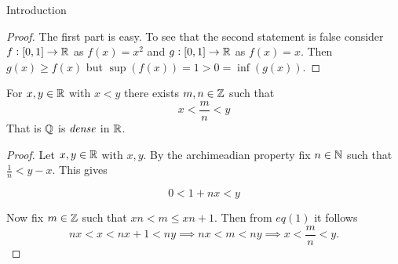 \begin{chapter}{Introduction}
    
    \begin{proof}
        The first part is easy. To see that the second statement is false consider $f:[0,1] \to \mathbb{R}$ as $f(x) = x^2$ and 
        $g: [0, 1] \to \mathbb{R}$ as $f(x) = x$. Then $g(x) \geq f(x)$ but $\sup(f(x)) = 1 > 0 = \inf(g(x))$. 
    \end{proof}


    
    \begin{thm}
        For $x, y \in \mathbb{R}$ with $x < y$ there exists $m, n \in \mathbb{Z}$ such that 
        \[x < \frac{m}{n} < y\]
        That is $\mathbb{Q}$ is $\emph{dense}$ in $\mathbb{R}$. 
    \end{thm}

    
    \begin{proof}
        Let $x, y \in \mathbb{R}$ with $x , y$. By the archimeadian property fix $n \in \mathbb{N}$ such that $\frac{1}{n} < y - x$. This gives 
        
        \[0 < 1 + nx < y \] 

        Now fix $m \in \mathbb{Z}$ such that $xn < m \leq xn + 1$. Then from $eq(1)$ it follows 
        \[nx< x < nx + 1 < ny \implies nx < m < ny \implies x < \frac{m}{n} < y. \]

    \end{proof}


\end{chapter}